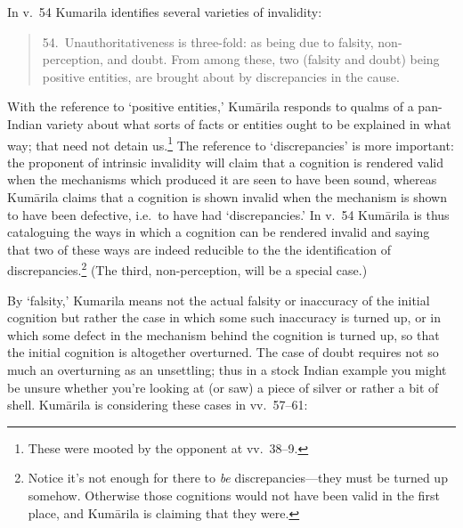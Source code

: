 ﻿\documentclass[11pt]{amsart}
\begin{document}
In v.~54 Kumarila identifies several varieties of invalidity:\small\begin{quote}54.~Unauthoritativeness is three-fold: as being due to falsity, non-perception, and doubt. From among these, two (falsity and doubt) being positive entities, are brought about by discrepancies in the cause.\end{quote}\normalsize With the reference to `positive entities,' Kum\=arila responds to qualms of a pan-Indian variety about what sorts of facts or entities ought to be explained in what way; that need not detain us.\footnote{These were mooted by the opponent at vv.~38--9.} The reference to `discrepancies' is more important: the proponent of intrinsic invalidity will claim that a cognition is rendered valid when the mechanisms which produced it are seen to have been sound, whereas Kum\=arila claims that a cognition is shown invalid when the mechanism is shown to have been defective, i.e.~to have had `discrepancies.' In v.~54 Kum\=arila is thus cataloguing the ways in which a cognition can be rendered invalid and saying that two of these ways are indeed reducible to the the identification of discrepancies.\footnote{Notice it's not enough for there to \emph{be} discrepancies---they must be turned up somehow. Otherwise those cognitions would not have been valid in the first place, and Kum\=arila is claiming that they were.} (The third, non-perception, will be a special case.)

By `falsity,' Kumarila means not the actual falsity or inaccuracy of the initial cognition but rather the case in which some such inaccuracy is turned up, or in which some defect in the mechanism behind the cognition is turned up, so that the initial cognition is altogether overturned. The case of doubt requires not so much an overturning as an unsettling; thus in a stock Indian example you might be unsure whether you're looking at (or saw) a piece of silver or rather a bit of shell. Kum\=arila is considering these cases in vv.~57--61:
\end{document}
